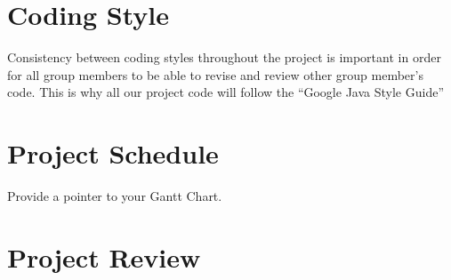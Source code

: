 \documentclass{article}
\begin{document}
\section{Coding Style}

Consistency between coding styles throughout the project is important in order for all group members to be able to revise and review other group member’s code. This is why all our project code will follow the “Google Java Style Guide”

\section{Project Schedule}

Provide a pointer to your Gantt Chart.

\section{Project Review}
\end{document}
